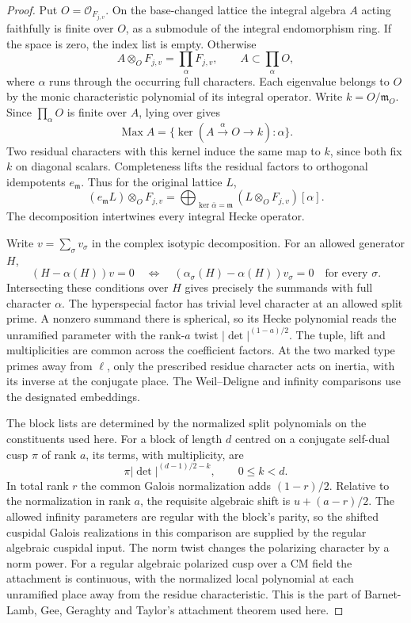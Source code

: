 \begin{proof}
Put \(O=\mathcal O_{F_{j,v}}\). On the base-changed lattice the integral
algebra \(A\) acting faithfully is finite over \(O\), as a submodule
of the integral endomorphism ring. If the space is zero, the index
list is empty. Otherwise
\[
 A\otimes_O F_{j,v}=\prod_{\alpha}F_{j,v},
 \qquad A\subset\prod_{\alpha} O ,
\]
where \(\alpha\) runs through the occurring full characters.
Each eigenvalue belongs to \(O\) by the monic characteristic
polynomial of its integral operator. Write \(k=O/\mathfrak m_O\).
Since \(\prod_\alpha O\) is finite over \(A\), lying over gives
\[
 \operatorname{Max}A
   =\{\ker(A\xrightarrow{\alpha}O\longrightarrow k):\alpha\}.
\]
Two residual characters with this kernel induce the same map
to \(k\), since both fix \(k\) on diagonal scalars. Completeness
lifts the residual factors to orthogonal idempotents \(e_{\mathfrak m}\).
Thus for the original lattice \(L\),
\[
 (e_{\mathfrak m}L)\otimes_O F_{j,v}
   =\bigoplus_{\ker\bar\alpha=\mathfrak m} (L\otimes_O F_{j,v})[\alpha].
\]
The decomposition intertwines every integral Hecke operator.

Write \(v=\sum_\sigma v_\sigma\) in the complex isotypic
decomposition. For an allowed generator \(H\),
\[
 (H-\alpha(H))v=0
 \quad\Longleftrightarrow\quad
   (\alpha_\sigma(H)-\alpha(H))v_\sigma=0\quad\text{for every }\sigma .
\]
Intersecting these conditions over \(H\) gives precisely the
summands with full character \(\alpha\). The hyperspecial factor
has trivial level character at an allowed split prime. A nonzero
summand there is spherical, so its Hecke polynomial reads the
unramified parameter with the rank-\(a\) twist
\(\lvert\det\rvert^{(1-a)/2}\). The tuple, lift and multiplicities
are common across the coefficient factors. At the two marked
type primes away from \(\ell\), only the prescribed residue
character acts on inertia, with its inverse at the conjugate
place. The Weil--Deligne and infinity comparisons use the
designated embeddings. \label{cor:automorphic-realization-35}

The block lists are determined by the normalized split polynomials
on the constituents used here. For a block of length \(d\) centred on a conjugate self-dual cusp
\(\pi\) of rank \(a\), its terms, with multiplicity, are
\[
           \pi |\det|^{(d-1)/2-k},\qquad 0\le k<d .
\] In total rank \(r\) the common
Galois normalization adds \((1-r)/2\). Relative to the normalization
in rank \(a\), the requisite algebraic shift is \(u+(a-r)/2\).
The allowed infinity parameters are regular with the block's
parity, so the shifted cuspidal Galois realizations in this comparison
are supplied by the regular algebraic cuspidal input. The norm twist
changes the polarizing character by a norm power. For a regular
algebraic polarized cusp over a CM field the attachment is
continuous, with the normalized local polynomial at each unramified
place away from the residue characteristic. This is the part of
Barnet-Lamb, Gee, Geraghty and Taylor's attachment theorem used here.


\end{proof}
